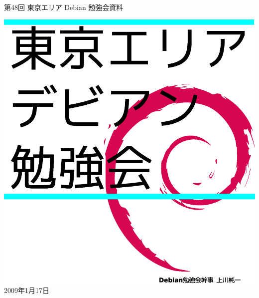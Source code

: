 \documentclass[mingoth,a4paper]{jsarticle}
\newcommand{\debmtgyear}{2009}
\newcommand{\debmtgmonth}{1}
\newcommand{\debmtgdate}{17}
\newcommand{\debmtgnumber}{48}
\begin{document}
\begin{titlepage}
\thispagestyle{empty}


\vspace*{-2cm}
第\debmtgnumber{}回 東京エリア Debian 勉強会資料

\hspace*{-2.4cm}
\includegraphics[width=210mm]{image200801/2008title.eps}\\
\hfill{}\debmtgyear{}年\debmtgmonth{}月\debmtgdate{}日

\end{titlepage}

\end{document}
